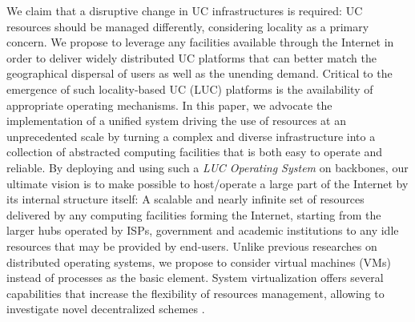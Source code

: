 We claim that a disruptive change in UC infrastructures is required: UC
resources should be managed differently, considering locality as a
primary concern. We propose to leverage any facilities available through the
Internet in order to deliver widely distributed UC platforms that can better
match the geographical dispersal of users as well as the unending demand.
Critical to the emergence of such locality-based UC (LUC) platforms is
the availability of appropriate operating mechanisms. In this paper, we
advocate the implementation of a unified system driving the use of
resources at an unprecedented scale by turning a complex and diverse
infrastructure into a collection of abstracted computing facilities that is
both easy to operate and reliable. 
%
By deploying and using such a \emph{LUC Operating System} on backbones,
our ultimate vision is to make possible to host/operate a large part of the
Internet by its internal structure itself: A scalable and nearly infinite set
of resources delivered by any computing facilities forming the Internet,
starting from the larger hubs operated by ISPs, government and academic
institutions to any idle resources that may be provided by end-users. 
%
Unlike previous researches on distributed operating systems, we propose to
consider virtual machines (VMs) instead of processes as the basic element.  System
virtualization offers several capabilities that increase the flexibility of
resources management, allowing to investigate novel decentralized schemes%
.


